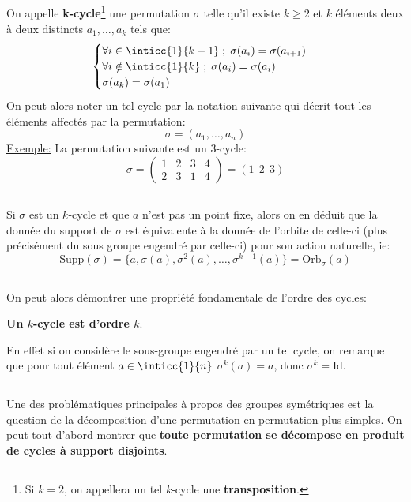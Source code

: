 \subsection*{}
On appelle \textbf{k-cycle}\footnote[1]{Si \( k = 2 \), on appellera un tel \( k \)-cycle une \textbf{transposition}.} une permutation \(\sigma\) telle qu'il existe \(k \geq 2\) et \(k\) éléments deux à deux distincts \(a_1, \ldots, a_k\) tels que:
\[
   \begin{cases}
      \forall i \in \inticc{1}{k-1} \; ; \; \sigma(a_i) = \sigma(a_{i+1}) \\
      \forall i \notin \inticc{1}{k} \; ; \; \sigma(a_i) = \sigma(a_{i}) \\
      \sigma(a_k) = \sigma(a_1)
   \end{cases} 
\]
On peut alors noter un tel cycle par la notation suivante qui décrit tout les éléments affectés par la permutation:
\[
   \sigma = (a_1, \ldots, a_n)  
\]
\underline{Exemple:} La permutation suivante est un 3-cycle:
\[
   \sigma =  \begin{pmatrix}
      1 & 2 & 3 & 4\\
      2 & 3 & 1 & 4
   \end{pmatrix} = (1 \;\, 2 \;\, 3)
\]
\subsection*{}
Si \(\sigma\) est un \(k\)-cycle et que \(a\) n'est pas un point fixe, alors on en déduit que la donnée du support de \(\sigma\) est équivalente à la donnée de l'orbite de celle-ci (plus précisément du sous groupe engendré par celle-ci) pour son action naturelle, ie:
\[
   \text{Supp}(\sigma) = \bigl\{a, \sigma(a), \sigma^2(a), \ldots, \sigma^{k-1}(a) \bigl\} = \text{Orb}_\sigma(a)
\]
\subsection*{}
On peut alors démontrer une propriété fondamentale de l'ordre des cycles:
\begin{center}
   \textbf{Un \(k\)-cycle est d'ordre \(k\)}.
\end{center}

En effet si on considère le sous-groupe engendré par un tel cycle, on remarque que pour tout élément \(a \in \inticc{1}{n}\) \(\sigma^{k}(a) = a\), donc \(\sigma^{k} = \text{Id}\).
\subsection*{}
Une des problématiques principales à propos des groupes symétriques est la question de la décomposition d'une permutation en permutation plus simples. On peut tout d'abord montrer que \textbf{toute permutation se décompose en produit de cycles à support disjoints}.\<

